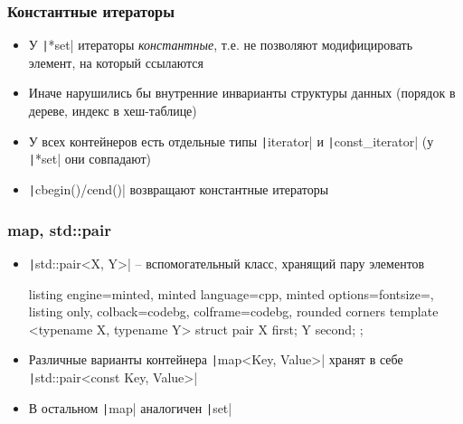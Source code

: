 \documentclass[10pt]{beamer}
\begin{document}
\begin{frame}[fragile]
\frametitle{Константные итераторы}
\begin{itemize}
\item У \texttt|*set| итераторы \textit{константные}, т.е. не позволяют модифицировать элемент, на который ссылаются
\pause
\item Иначе нарушились бы внутренние инварианты структуры данных (порядок в дереве, индекс в хеш-таблице)
\pause
\item У всех контейнеров есть отдельные типы \texttt|iterator| и \texttt|const_iterator| (у \texttt|*set| они совпадают)
\pause
\item \texttt|cbegin()/cend()| возвращают константные итераторы
\end{itemize}
\end{frame}

\begin{frame}[fragile]
\frametitle{map, std::pair}
\begin{itemize}
\item \texttt|std::pair<X, Y>| -- вспомогательный класс, хранящий пару элементов
\pause
{}
\begin{tcblisting}{listing engine=minted, minted language=cpp, minted options={fontsize=\scriptsize}, listing only, colback=codebg, colframe=codebg, rounded corners}
template <typename X, typename Y>
struct pair {
  X first;
  Y second;
};
\end{tcblisting}
\pause
{}
\item Различные варианты контейнера \texttt|map<Key, Value>| хранят в себе \texttt|std::pair<const Key, Value>|
\pause
\item В остальном \texttt|map| аналогичен \texttt|set|
\end{itemize}
\end{frame}
\end{document}
